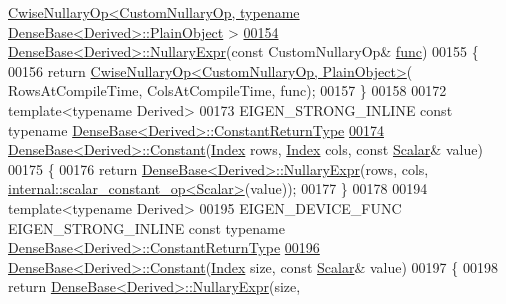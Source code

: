 \begin{DoxyCode}
      \hyperlink{group___core___module_class_eigen_1_1_cwise_nullary_op}{CwiseNullaryOp<CustomNullaryOp, typename DenseBase<Derived>::PlainObject}
      >
\hyperlink{group___core___module_ad33c54200cc61c83ea6a9636ec31401a}{00154} \hyperlink{group___core___module_class_eigen_1_1_dense_base}{DenseBase<Derived>::NullaryExpr}(\textcolor{keyword}{const} CustomNullaryOp& 
      \hyperlink{structfunc}{func})
00155 \{
00156   \textcolor{keywordflow}{return} \hyperlink{group___core___module_class_eigen_1_1_cwise_nullary_op}{CwiseNullaryOp<CustomNullaryOp, PlainObject>}(
      RowsAtCompileTime, ColsAtCompileTime, func);
00157 \}
00158 
00172 \textcolor{keyword}{template}<\textcolor{keyword}{typename} Derived>
00173 EIGEN\_STRONG\_INLINE \textcolor{keyword}{const} \textcolor{keyword}{typename} \hyperlink{group___core___module_class_eigen_1_1_cwise_nullary_op}{DenseBase<Derived>::ConstantReturnType}
\hyperlink{group___core___module_ab0ae1bfa72faedcaf53af81ca76c446b}{00174} \hyperlink{group___core___module_ab0ae1bfa72faedcaf53af81ca76c446b}{DenseBase<Derived>::Constant}(\hyperlink{namespace_eigen_a62e77e0933482dafde8fe197d9a2cfde}{Index} rows, \hyperlink{namespace_eigen_a62e77e0933482dafde8fe197d9a2cfde}{Index} cols, \textcolor{keyword}{const} 
      \hyperlink{group___core___module_a5feed465b3a8e60c47e73ecce83e39a2}{Scalar}& value)
00175 \{
00176   \textcolor{keywordflow}{return} \hyperlink{group___core___module_class_eigen_1_1_dense_base}{DenseBase<Derived>::NullaryExpr}(rows, cols, 
      \hyperlink{struct_eigen_1_1internal_1_1scalar__constant__op}{internal::scalar\_constant\_op<Scalar>}(value));
00177 \}
00178 
00194 \textcolor{keyword}{template}<\textcolor{keyword}{typename} Derived>
00195 EIGEN\_DEVICE\_FUNC EIGEN\_STRONG\_INLINE \textcolor{keyword}{const} \textcolor{keyword}{typename} 
      \hyperlink{group___core___module_class_eigen_1_1_cwise_nullary_op}{DenseBase<Derived>::ConstantReturnType}
\hyperlink{group___core___module_ad8236107f739860be6a5debeede8fdbf}{00196} \hyperlink{group___core___module_ab0ae1bfa72faedcaf53af81ca76c446b}{DenseBase<Derived>::Constant}(\hyperlink{namespace_eigen_a62e77e0933482dafde8fe197d9a2cfde}{Index} size, \textcolor{keyword}{const} 
      \hyperlink{group___core___module_a5feed465b3a8e60c47e73ecce83e39a2}{Scalar}& value)
00197 \{
00198   \textcolor{keywordflow}{return} \hyperlink{group___core___module_class_eigen_1_1_dense_base}{DenseBase<Derived>::NullaryExpr}(size, 

\end{DoxyCode}
